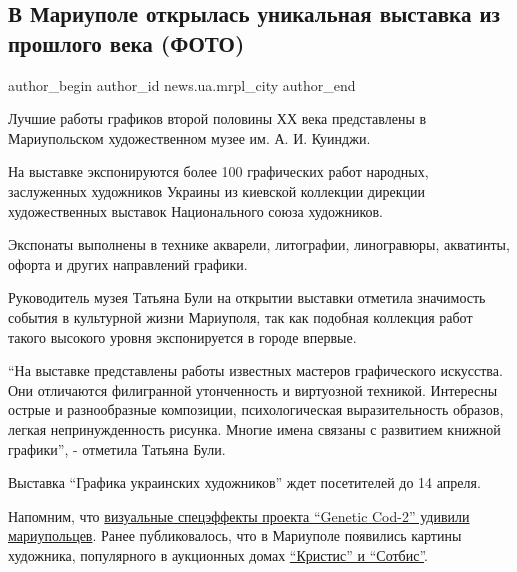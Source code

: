  
 
 
 
 
 
\subsection{В Мариуполе открылась уникальная выставка из прошлого века (ФОТО)}
\label{sec:08_03_2019.stz.news.ua.mrpl_city.1.vystavka_muzej_kuindzhi}
 
\ifcmt
 author_begin
   author_id news.ua.mrpl_city
 author_end
\fi

Лучшие работы графиков второй половины ХХ века представлены в Мариупольском
художественном музее им. А. И. Куинджи.

На выставке экспонируются более 100 графических работ народных, заслуженных
художников Украины из киевской коллекции дирекции художественных выставок
Национального союза художников.

Экспонаты выполнены в технике акварели, литографии, линогравюры, акватинты,
офорта и других направлений графики.

Руководитель музея Татьяна Були на открытии выставки отметила значимость
события в культурной жизни Мариуполя, так как подобная коллекция работ такого
высокого уровня экспонируется в городе впервые.

\enquote{На выставке представлены работы известных мастеров графического искусства. Они
отличаются филигранной утонченность и виртуозной техникой. Интересны острые и
разнообразные композиции, психологическая выразительность образов, легкая
непринужденность рисунка. Многие имена связаны с развитием книжной графики}, -
отметила Татьяна Були.

Выставка \enquote{Графика украинских художников} ждет посетителей до 14 апреля.

Напомним, что \href{https://mrpl.city/news/view/proekt-genetic-cod-2-vizualnye-spetse-ffekty-udivili-mariupoltsev-foto}{визуальные спецэффекты проекта \enquote{Genetic Cod-2} удивили
мариупольцев}. Ранее публиковалось, что в Мариуполе появились картины художника,
популярного в аукционных домах \href{https://mrpl.city/news/view/-341}{\enquote{Кристис} и \enquote{Сотбис}}.
